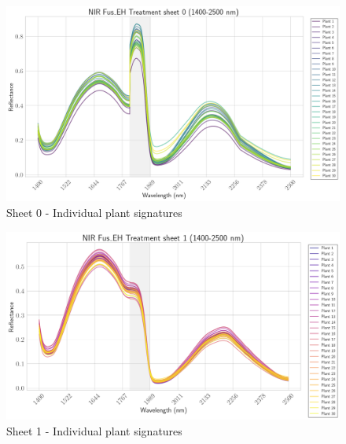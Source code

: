 \documentclass[12pt,a4paper]{article}
\begin{document}
\begin{figure}[H]
    \centering

    \includegraphics[width=\textwidth]{Plots/FusEH_Sheet0_Individual.png}
    \caption{Sheet 0 - Individual plant signatures}
    \label{fig:fus_eh_sheet0}

     
    \label{fig:fus_eh_individual}
\end{figure}

\begin{figure}[H]
    \centering
    \hfill

    \includegraphics[width=\textwidth]{Plots/FusEH_Sheet1_Individual.png}
    \caption{Sheet 1 - Individual plant signatures}
    \label{fig:fus_eh_sheet1}

     
\end{figure}
\end{document}

